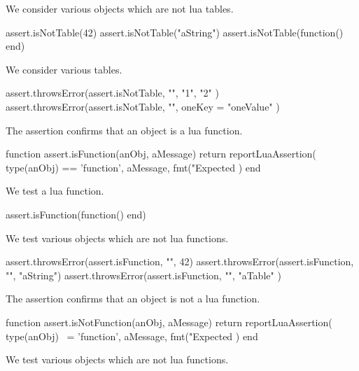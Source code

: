 
We consider various objects which are not lua tables.

\startLuaTest
  assert.isNotTable(42)
  assert.isNotTable("aString")
  assert.isNotTable(function() end)
\stopLuaTest
\stopTestCase


We consider various tables.

\startLuaTest
  assert.throwsError(assert.isNotTable, "", { "1", "2" })
  assert.throwsError(assert.isNotTable, "", { oneKey = "oneValue" })
\stopLuaTest
\stopTestCase

\stopTestSuite


The  assertion confirms that an object is a lua 
function. 

\startLuaCode
function assert.isFunction(anObj, aMessage)
  return reportLuaAssertion(
    type(anObj) == 'function',
    aMessage,
    fmt("Expected %
  )
end
\stopLuaCode


We test a lua function.

\startLuaTest
  assert.isFunction(function() end)
\stopLuaTest
\stopTestCase


We test various objects which are not lua functions.

\startLuaTest
  assert.throwsError(assert.isFunction, "", 42)
  assert.throwsError(assert.isFunction, "", "aString")
  assert.throwsError(assert.isFunction, "", { "aTable" })
\stopLuaTest
\stopTestCase

\stopTestSuite


The  assertion confirms that an object is not a 
lua function. 

\startLuaCode
function assert.isNotFunction(anObj, aMessage)
  return reportLuaAssertion(
    type(anObj) ~= 'function',
    aMessage,
    fmt("Expected %
  )
end
\stopLuaCode


We test various objects which are not lua functions.

